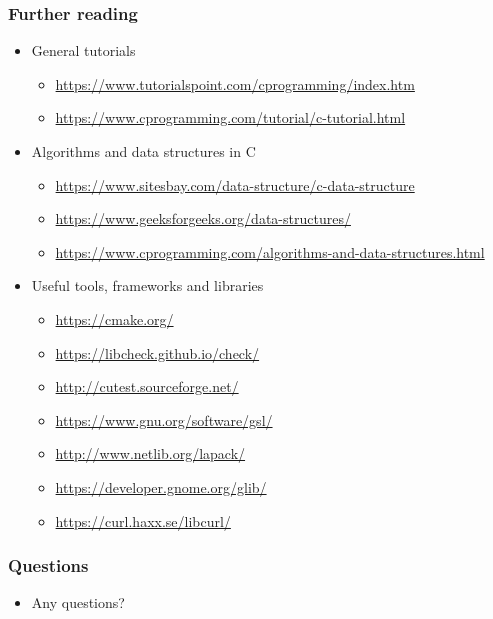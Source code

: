 \documentclass{beamer}
\begin{document}
\begin{frame}
    \frametitle{Further reading}
    \begin{itemize}
        \item General tutorials
            \begin{itemize}
                \item \url{https://www.tutorialspoint.com/cprogramming/index.htm}
                \item \url{https://www.cprogramming.com/tutorial/c-tutorial.html}
            \end{itemize}
        \item Algorithms and data structures in C
            \begin{itemize}
                \item \url{https://www.sitesbay.com/data-structure/c-data-structure}
                \item \url{https://www.geeksforgeeks.org/data-structures/}
                \item \url{https://www.cprogramming.com/algorithms-and-data-structures.html}
            \end{itemize}
        \item Useful tools, frameworks and libraries
            \begin{itemize}
                \item \url{https://cmake.org/}
                \item \url{https://libcheck.github.io/check/}
                \item \url{http://cutest.sourceforge.net/}
                \item \url{https://www.gnu.org/software/gsl/}
                \item \url{http://www.netlib.org/lapack/}
                \item \url{https://developer.gnome.org/glib/}
                \item \url{https://curl.haxx.se/libcurl/}
            \end{itemize}
    \end{itemize}
\end{frame}

\begin{frame}
    \frametitle{Questions}
    \begin{itemize}
        \item Any questions?
    \end{itemize}
\end{frame}
\end{document}
